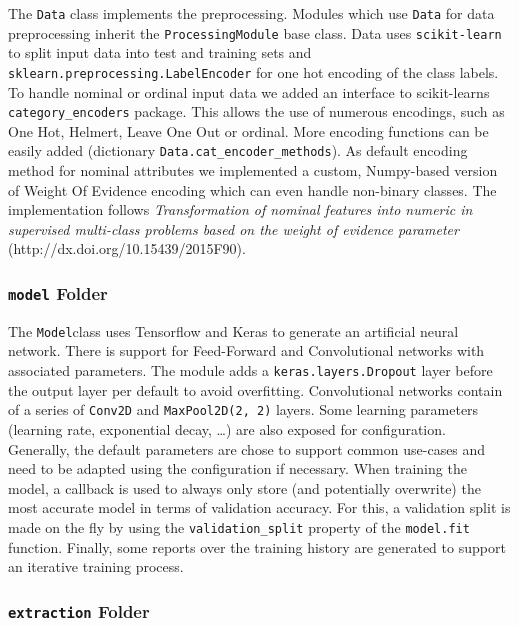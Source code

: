 \documentclass[
]{article}
\begin{document}
The \texttt{Data} class implements the preprocessing. Modules which use
\texttt{Data} for data preprocessing inherit the
\texttt{ProcessingModule} base class. Data uses \texttt{scikit-learn} to
split input data into test and training sets and
\texttt{sklearn.preprocessing.LabelEncoder} for one hot encoding of the
class labels. To handle nominal or ordinal input data we added an
interface to scikit-learns \texttt{category\_encoders} package. This
allows the use of numerous encodings, such as One Hot, Helmert, Leave
One Out or ordinal. More encoding functions can be easily added
(dictionary \texttt{Data.cat\_encoder\_methods}). As default encoding
method for nominal attributes we implemented a custom, Numpy-based
version of Weight Of Evidence encoding which can even handle non-binary
classes. The implementation follows \emph{Transformation of nominal
features into numeric in supervised multi-class problems based on the
weight of evidence parameter} (http://dx.doi.org/10.15439/2015F90).

\hypertarget{model-folder}{%
\subsubsection{\texorpdfstring{\texttt{model}
Folder}{model Folder}}\label{model-folder}}

The \texttt{Model}class uses Tensorflow and Keras to generate an
artificial neural network. There is support for Feed-Forward and
Convolutional networks with associated parameters. The module adds a
\texttt{keras.layers.Dropout} layer before the output layer per default
to avoid overfitting. Convolutional networks contain of a series of
\texttt{Conv2D} and \texttt{MaxPool2D(2,\ 2)} layers. Some learning
parameters (learning rate, exponential decay, \ldots) are also exposed
for configuration. Generally, the default parameters are chose to
support common use-cases and need to be adapted using the configuration
if necessary. When training the model, a callback is used to always only
store (and potentially overwrite) the most accurate model in terms of
validation accuracy. For this, a validation split is made on the fly by
using the \texttt{validation\_split} property of the \texttt{model.fit}
function. Finally, some reports over the training history are generated
to support an iterative training process.

\hypertarget{extraction-folder}{%
\subsubsection{\texorpdfstring{\texttt{extraction}
Folder}{extraction Folder}}\label{extraction-folder}}
\end{document}
